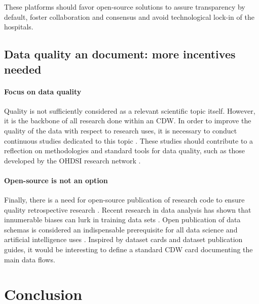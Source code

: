 \documentclass[french,12pt,twoside,a4paper]{book}
\begin{document}
These platforms should favor open-source solutions to assure transparency by
default, foster collaboration and consensus and avoid technological lock-in of
the hospitals.

\subsection{Data quality an document: more incentives needed}%
\label{subsec:cdw:recommendations:quality}%

\paragraph{Focus on data quality} Quality is not sufficiently considered as a relevant scientific topic itself.
However, it is the backbone of all research done within an CDW. In order to
improve the quality of the data with respect to research uses, it is necessary
to conduct continuous studies dedicated to this topic
\citep{zhang_best_2022,kohane_what_2021,shang_conceptual_2018,looten_what_2019}.
These studies should contribute to a reflection on methodologies and standard
tools for data quality, such as those developed by the OHDSI research network
\citep{schuemie_book_2021}.

\paragraph{Open-source is not an option} Finally, there is a need for
open-source publication of research code to ensure quality retrospective
research \citep{shang_conceptual_2018,seastedt_global_2022}. Recent research in
data analysis has shown that innumerable biases can lurk in training data sets
\citep{gebru_datasheets_2021,mehrabi_survey_2021}. Open publication of data
schemas is considered an indispensable prerequisite for all data science and
artificial intelligence uses \citep{gebru_datasheets_2021}. Inspired by dataset
cards \citep{gebru_datasheets_2021} and dataset publication guides, it would be
interesting to define a standard CDW card documenting the main data flows.

\section{Conclusion}\label{sec:cdw:conclusion}
\end{document}
